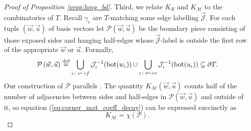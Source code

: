 \documentclass{amsart}
\newcommand{\defeq}{\stackrel{\tn{def}}{=}}
\newcommand{\tn}{\textnormal}
\begin{document}
\begin{proof}[Proof of Proposition \ref{prop:long_bd}]
Third, we relate $K_R$ and $K_\mathcal{M}$ to the combinatorics of $T$. Recall $\gamma_c$ are $T$-matching some edge labelling $\vec{\mathcal{J}}$. For each tuple $(\vec{w},\vec{u})$ of basis vectors let $\mathcal{P}(\vec{w},\vec{u})$ be the boundary piece consisting of those exposed sides and hanging half-edges whose $\vec{\mathcal{J}}$-label is outside the first row of the appropriate $\vec{w}$ or $\vec{u}$. Formally,
\begin{equation*}
\mathcal{P}\left(\vec{w},\vec{u}\right)\defeq\bigcup_{\iota\colon e\hookrightarrow f}\mathcal{J}_\iota^{-1}(\tn{bot}(w_\iota))\cup\bigcup_{\iota\colon v\hookrightarrow e}\mathcal{J}_\iota^{-1}(\tn{bot}(u_\iota))\subseteq\partial T.
\end{equation*}
Our construction of $\mathcal{P}$ parallels \cite[\S 5.6]{asymptotic_stats_random_covering_surfaces_MageePuder23}. The quantity $K_\mathcal{M}(\vec{w},\vec{u})$ counts half of the number of adjacencies between sides and half-edges in $\mathcal{P}(\vec{w},\vec{u})$ and outside of it, so equation (\ref{eq:corner_mat_coeff_decay}) can be expressed succinctly as
\begin{equation}\label{eq:corner_mc_decay_piece}
K_\mathcal{M}=\chi(\mathcal{P}).
\end{equation}


\end{proof}
\end{document}
